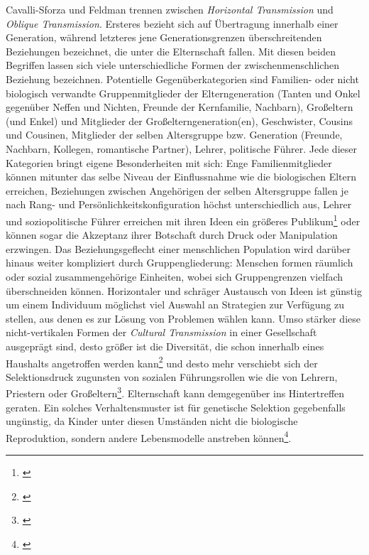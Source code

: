 \documentclass[openany,twoside,twocolumn]{book}
\let\rmarkdownfootnote\footnote%
\def\footnote{\protect\rmarkdownfootnote}
\begin{document}
Cavalli-Sforza und Feldman trennen zwischen \emph{Horizontal Transmission} und \emph{Oblique Transmission}. Ersteres bezieht sich auf Übertragung innerhalb einer Generation, während letzteres jene Generationsgrenzen überschreitenden Beziehungen bezeichnet, die unter die Elternschaft fallen. Mit diesen beiden Begriffen lassen sich viele unterschiedliche Formen der zwischenmenschlichen Beziehung bezeichnen. Potentielle Gegenüberkategorien sind Familien- oder nicht biologisch verwandte Gruppenmitglieder der Elterngeneration (Tanten und Onkel gegenüber Neffen und Nichten, Freunde der Kernfamilie, Nachbarn), Großeltern (und Enkel) und Mitglieder der Großelterngeneration(en), Geschwister, Cousins und Cousinen, Mitglieder der selben Altersgruppe bzw. Generation (Freunde, Nachbarn, Kollegen, romantische Partner), Lehrer, politische Führer. Jede dieser Kategorien bringt eigene Besonderheiten mit sich: Enge Familienmitglieder können mitunter das selbe Niveau der Einflussnahme wie die biologischen Eltern erreichen, Beziehungen zwischen Angehörigen der selben Altersgruppe fallen je nach Rang- und Persönlichkeitskonfiguration höchst unterschiedlich aus, Lehrer und soziopolitische Führer erreichen mit ihren Ideen ein größeres Publikum\footnote{\textcite{fogarty_evolution_2011}} oder können sogar die Akzeptanz ihrer Botschaft durch Druck oder Manipulation erzwingen. Das Beziehungsgeflecht einer menschlichen Population wird darüber hinaus weiter kompliziert durch Gruppengliederung: Menschen formen räumlich oder sozial zusammengehörige Einheiten, wobei sich Gruppengrenzen vielfach überschneiden können. Horizontaler und schräger Austausch von Ideen ist günstig um einem Individuum möglichst viel Auswahl an Strategien zur Verfügung zu stellen, aus denen es zur Lösung von Problemen wählen kann. Umso stärker diese nicht-vertikalen Formen der \emph{Cultural Transmission} in einer Gesellschaft ausgeprägt sind, desto größer ist die Diversität, die schon innerhalb eines Haushalts angetroffen werden kann\footnote{\textcite{shennan_genes_2002}} und desto mehr verschiebt sich der Selektionsdruck zugunsten von sozialen Führungsrollen wie die von Lehrern, Priestern oder Großeltern\footnote{\textcite{macdonald_subsistence_1998}}. Elternschaft kann demgegenüber ins Hintertreffen geraten. Ein solches Verhaltensmuster ist für genetische Selektion gegebenfalls ungünstig, da Kinder unter diesen Umständen nicht die biologische Reproduktion, sondern andere Lebensmodelle anstreben können\footnote{\textcite{smith_cultural_1992}}.
\end{document}
